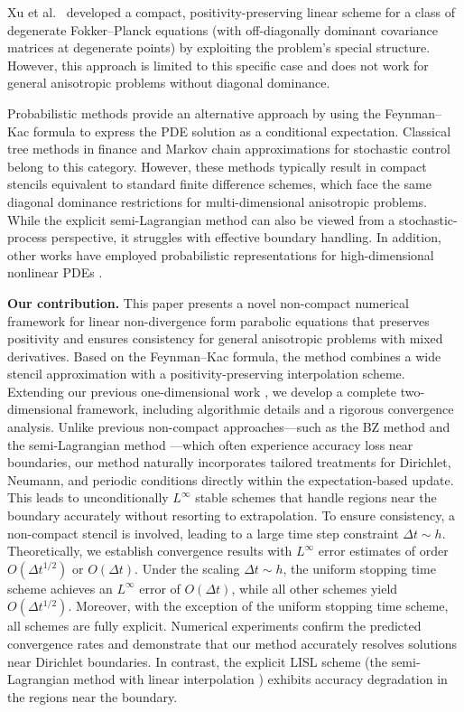 \documentclass[11pt]{article}
\theoremstyle{mythm}
\theoremstyle{definition}
\begin{document}
	Xu et al.\ \cite{bib16} developed a compact, positivity-preserving linear
	scheme for a class of degenerate Fokker--Planck equations (with
	off-diagonally dominant covariance matrices at degenerate points) by
	exploiting the problem's special structure.
	However, this approach is limited to this specific case and does not work
	for general anisotropic problems without diagonal dominance.
	
	Probabilistic methods provide an alternative approach by using the
	Feynman--Kac formula to express the PDE solution as a conditional
	expectation.
	Classical tree methods in finance \cite{bib5} and Markov chain
	approximations for stochastic control \cite{bib9} belong to this
	category.
	However, these methods typically result in compact stencils equivalent
	to standard finite difference schemes, which face the same diagonal
	dominance restrictions for multi-dimensional anisotropic problems.
	While the explicit semi-Lagrangian method \cite{bib4} can also be viewed
	from a stochastic-process perspective, it struggles with effective
	boundary handling.
	In addition, other works have employed probabilistic representations for
	high-dimensional nonlinear PDEs \cite{bib6,bib8,bib22}.
	
	\medskip
	\noindent\textbf{Our contribution.}
	This paper presents a novel non-compact numerical framework for linear
	non-divergence form parabolic equations that preserves positivity and
	ensures consistency for general anisotropic problems with mixed
	derivatives.
	Based on the Feynman--Kac formula, the method combines a wide stencil
	approximation with a positivity-preserving interpolation scheme.
	Extending our previous one-dimensional work \cite{bib23}, we develop a
	complete two-dimensional framework, including algorithmic details and a
	rigorous convergence analysis.
	Unlike previous non-compact approaches—such as the BZ method \cite{bib2}
	and the semi-Lagrangian method \cite{bib4}—which often experience
	accuracy loss near boundaries, our method naturally incorporates
	tailored treatments for Dirichlet, Neumann, and periodic conditions
	directly within the expectation-based update.
	This leads to unconditionally $L^\infty$ stable schemes that handle
	regions near the boundary accurately without resorting to extrapolation.
	To ensure consistency, a non-compact stencil is involved, leading to a
	large time step constraint $\Delta t \sim h$.
	Theoretically, we establish convergence results with $L^\infty$ error
	estimates of order $O(\Delta t^{1/2})$ or $O(\Delta t)$.
	Under the scaling $\Delta t \sim h$, the uniform stopping time scheme
	achieves an $L^\infty$ error of $O(\Delta t)$, while all other schemes
	yield $O(\Delta t^{1/2})$.
	Moreover, with the exception of the uniform stopping time scheme, all
	schemes are fully explicit.
	Numerical experiments confirm the predicted convergence rates and
	demonstrate that our method accurately resolves solutions near Dirichlet
	boundaries.
	In contrast, the explicit LISL scheme (the semi-Lagrangian method with
	linear interpolation \cite{bib4}) exhibits accuracy degradation in the
	regions near the boundary.
	
\end{document}
